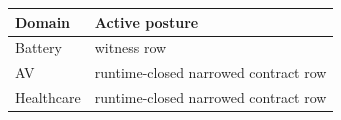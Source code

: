 \begin{tabular}{ll}Domain & Active posture\\\midrule Battery & witness row\\ AV & runtime-closed narrowed contract row\\ Healthcare & runtime-closed narrowed contract row\\\end{tabular}

